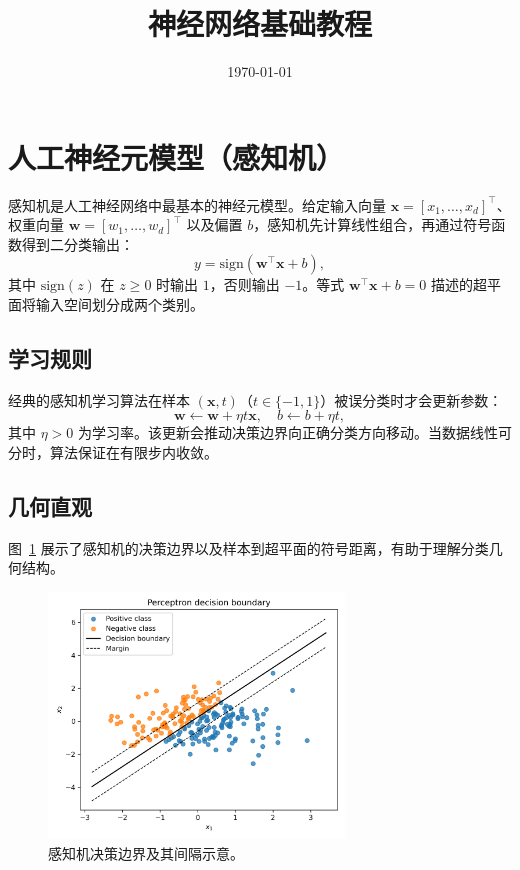 ﻿\documentclass{ctexart}
\title{神经网络基础教程}
\author{}
\date{\today}
\begin{document}
\maketitle
\tableofcontents
\FloatBarrier

\section{人工神经元模型（感知机）}
感知机是人工神经网络中最基本的神经元模型。给定输入向量 $\mathbf{x}=[x_1,\ldots,x_d]^\top$、权重向量 $\mathbf{w}=[w_1,\ldots,w_d]^\top$ 以及偏置 $b$，感知机先计算线性组合，再通过符号函数得到二分类输出：
\begin{equation}
  y = \mathrm{sign}\left(\mathbf{w}^\top \mathbf{x} + b\right),
\end{equation}
其中 $\mathrm{sign}(z)$ 在 $z\ge 0$ 时输出 $1$，否则输出 $-1$。等式 $\mathbf{w}^\top\mathbf{x}+b=0$ 描述的超平面将输入空间划分成两个类别。

\subsection{学习规则}
经典的感知机学习算法在样本 $(\mathbf{x}, t)$（$t\in\{-1,1\}$）被误分类时才会更新参数：
\begin{equation}
  \mathbf{w} \leftarrow \mathbf{w} + \eta t \mathbf{x}, \quad b \leftarrow b + \eta t,
\end{equation}
其中 $\eta>0$ 为学习率。该更新会推动决策边界向正确分类方向移动。当数据线性可分时，算法保证在有限步内收敛。

\subsection{几何直观}
图~\ref{fig:perceptron_decision_boundary} 展示了感知机的决策边界以及样本到超平面的符号距离，有助于理解分类几何结构。

\begin{figure}[H]
  \centering
  \includegraphics[width=0.7\textwidth]{perceptron_decision_boundary.png}
  \caption{感知机决策边界及其间隔示意。}
  \label{fig:perceptron_decision_boundary}
\end{figure}
\FloatBarrier
\end{document}
